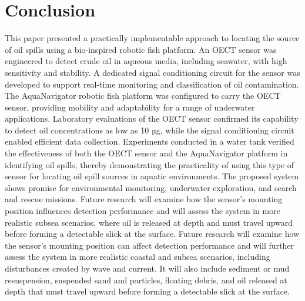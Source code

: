 \documentclass{iopjournal}
\begin{document}
\section{Conclusion}
This paper presented a practically implementable approach to locating the source of oil spills using a bio-inspired robotic fish platform. An OECT sensor was engineered to detect crude oil in aqueous media, including seawater, with high sensitivity and stability. A dedicated signal conditioning circuit for the sensor was developed to support real-time monitoring and classification of oil contamination. The AquaNavigator robotic fish platform was configured to carry the OECT sensor, providing mobility and adaptability for a range of underwater applications. Laboratory evaluations of the OECT sensor confirmed its capability to detect oil concentrations as low as 10 µg, while the signal conditioning circuit enabled efficient data collection. Experiments conducted in a water tank verified the effectiveness of both the OECT sensor and the AquaNavigator platform in identifying oil spills, thereby demonstrating the practicality of using this type of sensor for locating oil spill sources in aquatic environments. The proposed system shows promise for environmental monitoring, underwater exploration, and search and rescue missions. Future research will examine how the sensor’s mounting position influences detection performance and will assess the system in more realistic subsea scenarios, where oil is released at depth and must travel upward before forming a detectable slick at the surface.
Future research will examine how the sensor’s mounting position can affect detection performance and will further assess the system in more realistic coastal and subsea scenarios, including disturbances created by wave and current. It will also include sediment or mud resuspension, suspended sand and particles, floating debris, and oil released at depth that must travel upward before forming a detectable slick at the surface.
% 



\end{document}
